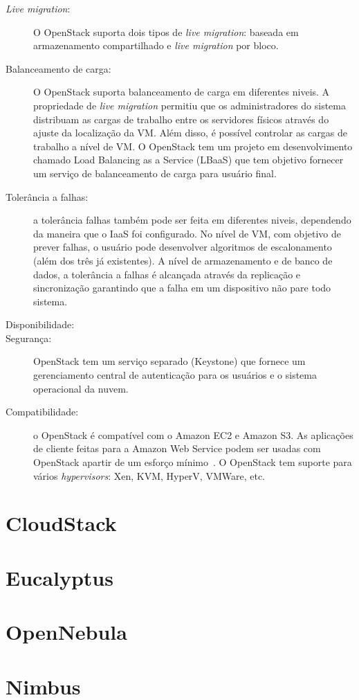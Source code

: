 \begin{description}

	\item[\textit{Live migration}:] O OpenStack suporta dois tipos de \textit{live migration}: baseada em armazenamento compartilhado e \textit{live migration} por bloco.

	\item[Balanceamento de carga:] O OpenStack suporta balanceamento de carga em diferentes niveis. A propriedade de \textit{live migration} permitiu que os administradores do sistema distribuam as cargas de trabalho entre os servidores físicos através do ajuste da localização da VM. Além disso, é possível controlar as cargas de trabalho a nível de VM. O OpenStack tem um projeto em desenvolvimento chamado Load Balancing as a Service (LBaaS) que tem objetivo fornecer um serviço de balanceamento de carga para usuário final.

	\item[Tolerância a falhas:] a tolerância  falhas também pode ser feita em diferentes niveis, dependendo da maneira que o IaaS foi configurado. No nível de VM, com objetivo de prever falhas, o usuário pode desenvolver algoritmos de escalonamento (além dos três já existentes). A nível de armazenamento e de banco de dados, a tolerância a falhas é alcançada através da replicação e sincronização garantindo que a falha em um dispositivo não pare todo sistema.

	\item[Disponibilidade:] 

	\item[Segurança:] OpenStack tem um serviço separado (Keystone) que fornece um gerenciamento central de autenticação para os usuários e o sistema operacional da nuvem.

	\item[Compatibilidade:] o OpenStack é compatível com o Amazon EC2 e Amazon S3. As aplicações de cliente feitas para a Amazon Web Service podem ser usadas com OpenStack apartir de um esforço mínimo~\cite{OpenStack:Online}. O OpenStack tem suporte para vários \textit{hypervisors}: Xen, KVM, HyperV, VMWare, etc.

\end{description}


\section{CloudStack}

\section{Eucalyptus}

\section{OpenNebula}

\section{Nimbus}




